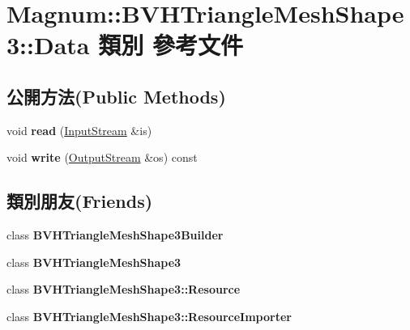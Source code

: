 \hypertarget{class_magnum_1_1_b_v_h_triangle_mesh_shape3_1_1_data}{}\section{Magnum\+:\+:B\+V\+H\+Triangle\+Mesh\+Shape3\+:\+:Data 類別 參考文件}
\label{class_magnum_1_1_b_v_h_triangle_mesh_shape3_1_1_data}
\subsection*{公開方法(Public Methods)}
\begin{DoxyCompactItemize}
\item 
void {\bfseries read} (\hyperlink{class_magnum_1_1_input_stream}{Input\+Stream} \&is)\hypertarget{class_magnum_1_1_b_v_h_triangle_mesh_shape3_1_1_data_a30688902e321d811eeee8ac175f4ffb7}{}\label{class_magnum_1_1_b_v_h_triangle_mesh_shape3_1_1_data_a30688902e321d811eeee8ac175f4ffb7}

\item 
void {\bfseries write} (\hyperlink{class_magnum_1_1_output_stream}{Output\+Stream} \&os) const \hypertarget{class_magnum_1_1_b_v_h_triangle_mesh_shape3_1_1_data_a301e85bfc86a86270045102b90e7cae5}{}\label{class_magnum_1_1_b_v_h_triangle_mesh_shape3_1_1_data_a301e85bfc86a86270045102b90e7cae5}

\end{DoxyCompactItemize}
\subsection*{類別朋友(Friends)}
\begin{DoxyCompactItemize}
\item 
class {\bfseries B\+V\+H\+Triangle\+Mesh\+Shape3\+Builder}\hypertarget{class_magnum_1_1_b_v_h_triangle_mesh_shape3_1_1_data_a0f649365ade947ac32bf9c7a71b53fef}{}\label{class_magnum_1_1_b_v_h_triangle_mesh_shape3_1_1_data_a0f649365ade947ac32bf9c7a71b53fef}

\item 
class {\bfseries B\+V\+H\+Triangle\+Mesh\+Shape3}\hypertarget{class_magnum_1_1_b_v_h_triangle_mesh_shape3_1_1_data_a7d93684b283f743d08e2f2bd03a8bbec}{}\label{class_magnum_1_1_b_v_h_triangle_mesh_shape3_1_1_data_a7d93684b283f743d08e2f2bd03a8bbec}

\item 
class {\bfseries B\+V\+H\+Triangle\+Mesh\+Shape3\+::\+Resource}\hypertarget{class_magnum_1_1_b_v_h_triangle_mesh_shape3_1_1_data_ac4877a9b420bd82dfa94ecb349aaf30c}{}\label{class_magnum_1_1_b_v_h_triangle_mesh_shape3_1_1_data_ac4877a9b420bd82dfa94ecb349aaf30c}

\item 
class {\bfseries B\+V\+H\+Triangle\+Mesh\+Shape3\+::\+Resource\+Importer}\hypertarget{class_magnum_1_1_b_v_h_triangle_mesh_shape3_1_1_data_a4cabc043c009b59e57956377e8726767}{}\label{class_magnum_1_1_b_v_h_triangle_mesh_shape3_1_1_data_a4cabc043c009b59e57956377e8726767}

\end{DoxyCompactItemize}


